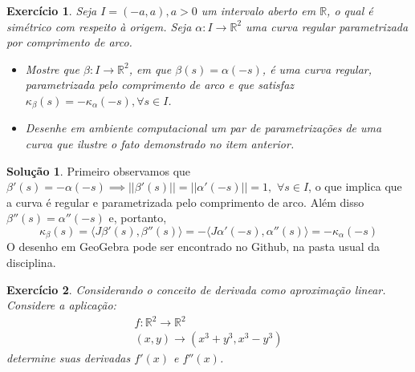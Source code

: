 \documentclass[a4paper,12pt]{article}
\newcommand{\R}{\mathbb{R}}
\theoremstyle{exer}
\newtheorem{exercise}{Exercício}
\theoremstyle{definition}
\newtheorem{solution}{Solução}
\theoremstyle{plain}
\begin{document}
\begin{exercise}
    Seja $I = (-a,a), a > 0$ um intervalo aberto em $\R$, o qual é simétrico
    com respeito à origem. Seja $\alpha : I \to \R^2$ uma curva regular
    parametrizada por comprimento de arco. 
    \begin{itemize}
        \item Mostre que $\beta : I \to \R^2$, em que $\beta(s) = \alpha(-s)$,
        é uma curva regular, parametrizada pelo comprimento de arco e que
        satisfaz $\kappa_{\beta}(s) = -\kappa_{\alpha}(-s), \forall s \in I$.
        \item Desenhe em ambiente computacional um par de parametrizações de
        uma curva que ilustre o fato demonstrado no item anterior.
    \end{itemize}
\end{exercise}

\begin{solution}
    Primeiro observamos que $\beta '(s) = -\alpha(-s) \implies ||\beta'(s)|| =
    ||\alpha '(-s)|| = 1,$ $\forall s \in I$, o que implica que a curva é
    regular e parametrizada pelo comprimento de arco. Além disso $\beta''(s) =
    \alpha''(-s)$ e, portanto, 
    $$
    \kappa_{\beta}(s) = \langle J\beta '(s), \beta''(s) \rangle = - \langle J\alpha'(-s), \alpha ''(s) \rangle = - \kappa_{\alpha}(-s) 
    $$
    O desenho em GeoGebra pode ser encontrado no Github, na pasta usual da
    disciplina. 
\end{solution}

\begin{exercise}
    Considerando o conceito de derivada como aproximação linear. Considere a
    aplicação: 
    \begin{gather}
        f: \R^2 \to \R^2 \\
        (x,y) \to (x^3 + y^3, x^3 - y^3) 
    \end{gather}
    determine suas derivadas $f'(x)$ e $f''(x)$. 
\end{exercise}
\end{document}
